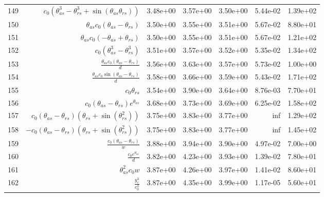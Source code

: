\begin{tabularx}{\textwidth}{lRRRRRl}
149  &  $ c_{0} \left(\theta_{as}^{3} - \theta_{rs}^{3} + \sin{\left(\theta_{as} \theta_{rs} \right)}\right) $  &  3.48e+00  &  3.57e+00  &  3.50e+00  &  5.44e-02  &  1.39e+02  \\ 
150  &  $ \theta_{as} c_{0} \left(\theta_{as} - \theta_{rs}\right) $  &  3.50e+00  &  3.55e+00  &  3.51e+00  &  5.67e-02  &  8.80e+01  \\ 
151  &  $ \theta_{as} c_{0} \left(- \theta_{as} + \theta_{rs}\right) $  &  3.50e+00  &  3.55e+00  &  3.51e+00  &  5.67e-02  &  1.21e+02  \\ 
152  &  $ c_{0} \left(\theta_{as}^{3} - \theta_{rs}^{3}\right) $  &  3.51e+00  &  3.57e+00  &  3.52e+00  &  5.35e-02  &  1.34e+02  \\ 
153  &  $ \displaystyle\frac{\theta_{as} c_{0} \left(\theta_{as} - \theta_{rs}\right)}{d} $  &  3.56e+00  &  3.63e+00  &  3.57e+00  &  5.73e-02  &  1.00e+00  \\ 
154  &  $ \displaystyle\frac{\theta_{as} c_{0} \sin{\left(\theta_{as} - \theta_{rs} \right)}}{d} $  &  3.58e+00  &  3.66e+00  &  3.59e+00  &  5.43e-02  &  1.71e+02  \\ 
155  &  $ c_{0} \theta_{rs} $  &  3.54e+00  &  3.90e+00  &  3.64e+00  &  8.76e-03  &  7.70e+01  \\ 
156  &  $ c_{0} \left(\theta_{as} - \theta_{rs}\right) e^{\theta_{as}} $  &  3.68e+00  &  3.73e+00  &  3.69e+00  &  6.25e-02  &  1.58e+02  \\ 
157  &  $ c_{0} \left(\theta_{as} - \theta_{rs}\right) \left(\theta_{rs} + \sin{\left(\theta_{rs}^{2} \right)}\right) $  &  3.75e+00  &  3.83e+00  &  3.77e+00  &  inf  &  1.29e+02  \\ 
158  &  $ - c_{0} \left(\theta_{as} - \theta_{rs}\right) \left(\theta_{rs} + \sin{\left(\theta_{rs}^{2} \right)}\right) $  &  3.75e+00  &  3.83e+00  &  3.77e+00  &  inf  &  1.45e+02  \\ 
159  &  $ \displaystyle\frac{c_{0} \left(\theta_{as} - \theta_{rs}\right)}{w} $  &  3.88e+00  &  3.94e+00  &  3.90e+00  &  4.97e-02  &  7.00e+00  \\ 
160  &  $ \displaystyle\frac{c_{0} e^{\theta_{as}}}{d} $  &  3.82e+00  &  4.23e+00  &  3.93e+00  &  1.39e-02  &  7.80e+01  \\ 
161  &  $ \theta_{as}^{2} c_{0} w $  &  3.87e+00  &  4.26e+00  &  3.97e+00  &  1.41e-02  &  8.60e+01  \\ 
162  &  $ \displaystyle\frac{y_c^{3}}{c_{0}^{3}} $  &  3.87e+00  &  4.35e+00  &  3.99e+00  &  1.17e-05  &  5.60e+01  \\ 

\end{tabularx}
